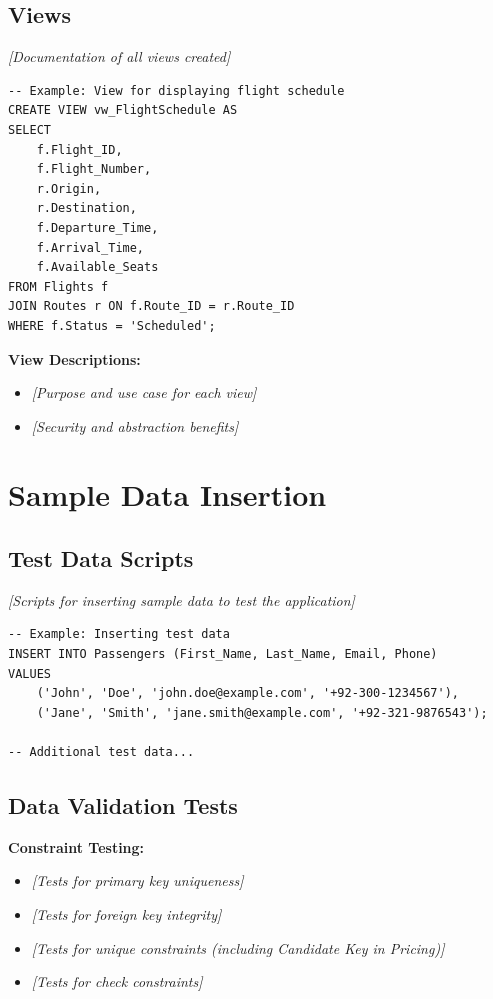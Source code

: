 \documentclass[12pt,a4paper,openany]{report}
\begin{document}
\subsection{Views}

\textit{[Documentation of all views created]}

\begin{lstlisting}[caption={Sample View - Flight Schedule}]
-- Example: View for displaying flight schedule
CREATE VIEW vw_FlightSchedule AS
SELECT 
    f.Flight_ID,
    f.Flight_Number,
    r.Origin,
    r.Destination,
    f.Departure_Time,
    f.Arrival_Time,
    f.Available_Seats
FROM Flights f
JOIN Routes r ON f.Route_ID = r.Route_ID
WHERE f.Status = 'Scheduled';
\end{lstlisting}

\textbf{View Descriptions:}
\begin{itemize}
    \item \textit{[Purpose and use case for each view]}
    \item \textit{[Security and abstraction benefits]}
\end{itemize}

\section{Sample Data Insertion}

\subsection{Test Data Scripts}

\textit{[Scripts for inserting sample data to test the application]}

\begin{lstlisting}[caption={Sample Data Insertion}]
-- Example: Inserting test data
INSERT INTO Passengers (First_Name, Last_Name, Email, Phone) 
VALUES 
    ('John', 'Doe', 'john.doe@example.com', '+92-300-1234567'),
    ('Jane', 'Smith', 'jane.smith@example.com', '+92-321-9876543');

-- Additional test data...
\end{lstlisting}

\subsection{Data Validation Tests}

\textbf{Constraint Testing:}
\begin{itemize}
    \item \textit{[Tests for primary key uniqueness]}
    \item \textit{[Tests for foreign key integrity]}
    \item \textit{[Tests for unique constraints (including Candidate Key in Pricing)]}
    \item \textit{[Tests for check constraints]}
\end{itemize}
\end{document}
